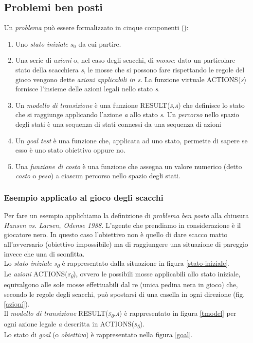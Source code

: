 \subsection{Problemi ben posti}
Un \emph{problema} può essere formalizzato in cinque componenti (\cite{randw}):
\begin{enumerate}
   \item Uno \emph{stato iniziale} $s_0$ da cui partire.
   \item Una serie di \emph{azioni} o, nel caso degli scacchi, di \emph{mosse}: dato un particolare stato della scacchiera \emph{s}, le mosse che si possono fare rispettando le regole del gioco vengono dette \emph{azioni applicabili in \emph{s}}. La funzione virtuale \textsc{ACTIONS(\emph{s})} fornisce l'insieme delle azioni legali nello stato \emph{s}.
   \item Un \emph{modello di transizione} è una funzione \textsc{RESULT(\emph{s},\emph{a})} che definisce lo stato che si raggiunge applicando l'azione \emph{a} allo stato \emph{s}.
Un \emph{percorso} nello spazio degli stati è una sequenza di stati connessi da una sequenza di azioni
   \item Un \emph{goal test} è una funzione che, applicata ad uno stato, permette di sapere se esso è uno stato obiettivo oppure no.
   \item Una \emph{funzione di costo} è una funzione che assegna un valore numerico (detto \emph{costo} o \emph{peso}) a ciascun percorso nello spazio degli stati.
\end{enumerate}

\subsubsection*{Esempio applicato al gioco degli scacchi}
Per fare un esempio applichiamo la definizione di \emph{problema ben posto} alla chiusura \emph{Hansen vs. Larsen, Odense 1988}.
L'agente che prendiamo in considerazione è il giocatore nero.
In questo caso l'obiettivo non è quello di dare scacco matto all'avversario (obiettivo impossibile) ma di raggiungere una situazione di pareggio invece che una di sconfitta.\\
Lo \emph{stato iniziale} \emph{s\textsubscript{0}} è rappresentato dalla situazione in figura \ref{stato-iniziale}.\\
Le \emph{azioni} \textsc{ACTIONS(\emph{s\textsubscript{0}})}, ovvero le possibili mosse applicabili allo stato iniziale, equivalgono alle sole mosse effettuabili dal re (unica pedina nera in gioco) che, secondo le regole degli scacchi, può spostarsi di una casella in ogni direzione (fig. \ref{azioni}).\\
Il \emph{modello di transizione} \textsc{RESULT(\emph{s\textsubscript{0}},\emph{a})} è rappresentato in figura \ref{tmodel} per ogni azione legale \emph{a} descritta in \textsc{ACTIONS(\emph{s\textsubscript{0}})}.\\
Lo stato di \emph{goal} (o \emph{obiettivo}) è rappresentato nella figura \ref{goal}.


